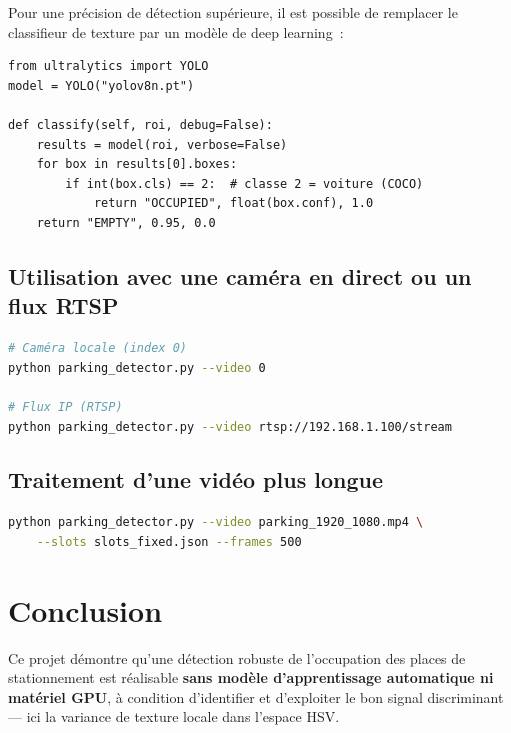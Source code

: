 \documentclass[12pt,a4paper]{report}
\begin{document}
Pour une précision de détection supérieure, il est possible de remplacer le classifieur de texture par un modèle de deep learning~:

\begin{lstlisting}[caption={Intégration YOLOv8 (classe 2 = voiture dans COCO)}]
from ultralytics import YOLO
model = YOLO("yolov8n.pt")

def classify(self, roi, debug=False):
    results = model(roi, verbose=False)
    for box in results[0].boxes:
        if int(box.cls) == 2:  # classe 2 = voiture (COCO)
            return "OCCUPIED", float(box.conf), 1.0
    return "EMPTY", 0.95, 0.0
\end{lstlisting}

\section{Utilisation avec une caméra en direct ou un flux RTSP}

\begin{lstlisting}[language=bash, numbers=none]
# Caméra locale (index 0)
python parking_detector.py --video 0

# Flux IP (RTSP)
python parking_detector.py --video rtsp://192.168.1.100/stream
\end{lstlisting}

\section{Traitement d'une vidéo plus longue}

\begin{lstlisting}[language=bash, numbers=none]
python parking_detector.py --video parking_1920_1080.mp4 \
    --slots slots_fixed.json --frames 500
\end{lstlisting}

\chapter{Conclusion}

Ce projet démontre qu'une détection robuste de l'occupation des places de stationnement est réalisable \textbf{sans modèle d'apprentissage automatique ni matériel GPU}, à condition d'identifier et d'exploiter le bon signal discriminant — ici la variance de texture locale dans l'espace HSV.
\end{document}
